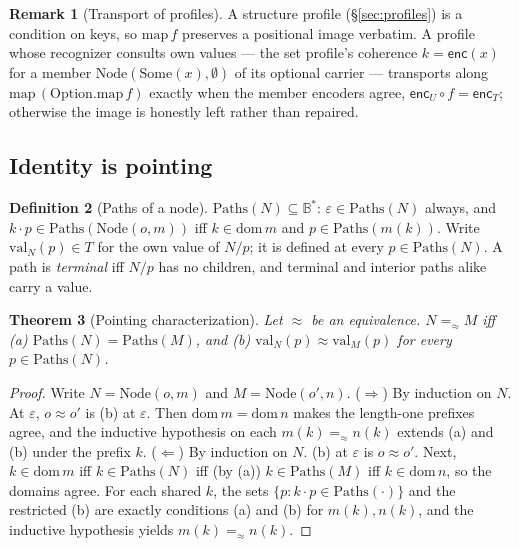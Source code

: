 \documentclass[11pt]{article}
\newtheorem{theorem}{Theorem}[section]
\theoremstyle{definition}
\newtheorem{definition}[theorem]{Definition}
\newtheorem{remark}[theorem]{Remark}
\newcommand{\Bytes}{\mathbb{B}}                    %
\newcommand{\dom}{\mathrm{dom}\,}
\newcommand{\eqS}{=_{\approx}}                     %
\newcommand{\enc}{\mathsf{enc}}
\newcommand{\Paths}{\mathrm{Paths}}
\begin{document}
\begin{remark}[Transport of profiles]
A structure profile (\S\ref{sec:profiles}) is a condition on keys, so
$\mathrm{map}\,f$ preserves a positional image verbatim. A profile whose recognizer
consults own values --- the set profile's coherence $k = \enc(x)$ for a member
$\mathrm{Node}(\mathrm{Some}(x), \emptyset)$ of its optional carrier --- transports
along $\mathrm{map}\,(\mathrm{Option}.\mathrm{map}\,f)$ exactly when the member encoders
agree, $\enc_U \circ f = \enc_T$;
otherwise the image is honestly left rather than repaired.
\end{remark}

\subsection{Identity is pointing}

\begin{definition}[Paths of a node]\label{def:paths}
$\Paths(N) \subseteq \Bytes^{*}$:\; $\varepsilon \in \Paths(N)$ always, and
$k \cdot p \in \Paths(\mathrm{Node}(o, m))$ iff $k \in \dom m$ and $p \in \Paths(m(k))$.
Write $\mathrm{val}_N(p) \in T$ for the own value of $N/p$; it is defined at every
$p \in \Paths(N)$. A path is \emph{terminal} iff $N/p$ has no children, and terminal and
interior paths alike carry a value.
\end{definition}

\begin{theorem}[Pointing characterization]\label{thm:pointing}
Let $\approx$ be an equivalence. $N \eqS M$ iff
\emph{(a)} $\Paths(N) = \Paths(M)$, and
\emph{(b)} $\mathrm{val}_N(p) \approx \mathrm{val}_M(p)$ for every $p \in \Paths(N)$.
\end{theorem}

\begin{proof}
Write $N = \mathrm{Node}(o, m)$ and $M = \mathrm{Node}(o', n)$.
($\Rightarrow$) By induction on $N$. At $\varepsilon$, $o \approx o'$ is (b) at
$\varepsilon$. Then $\dom m = \dom n$ makes the length-one prefixes agree, and the
inductive hypothesis on each $m(k) \eqS n(k)$ extends (a) and (b) under the prefix $k$.
($\Leftarrow$) By induction on $N$. (b) at $\varepsilon$ is $o \approx o'$. Next, $k \in \dom m$ iff $k \in \Paths(N)$ iff (by (a)) $k \in \Paths(M)$
iff $k \in \dom n$, so the domains agree. For each shared $k$, the sets
$\{p : k \cdot p \in \Paths(\cdot)\}$ and the restricted (b) are exactly conditions
(a) and (b) for $m(k), n(k)$, and the inductive hypothesis yields $m(k) \eqS n(k)$.
\end{proof}
\end{document}
